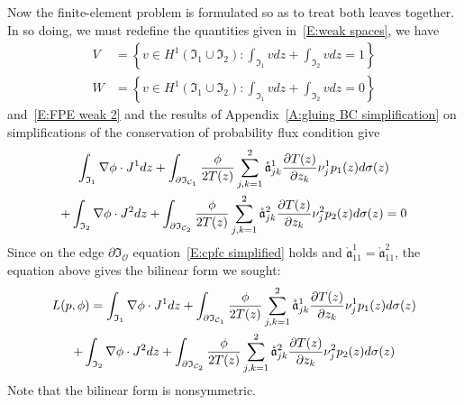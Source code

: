 Now the finite-element problem is formulated so as to treat both leaves together. In so doing, we must redefine the quantities given in~\eqref{E:weak spaces}, we have
\begin{align*}
V &= \left\{v \in H^1(\mathfrak I_1 \cup \mathfrak I_2): \int_\mathfrak{I_1} v dz + \int_\mathfrak{I_2} v dz = 1\right\}\\
W &= \left\{v \in H^1(\mathfrak I_1 \cup \mathfrak I_2): \int_\mathfrak{I_1} v dz + \int_\mathfrak{I_2} v dz = 0\right\}
\end{align*}
and~\eqref{E:FPE weak 2} and the results of Appendix~\ref{A:gluing BC simplification} on simplifications of the conservation of probability flux condition give
\begin{multline*}
\int_{\mathfrak I_1} \nabla \phi \cdot J^1 dz + \int_{\partial \mathfrak I_{\mathcal C_1}} \frac{\phi}{2 T(z)} \sum_{j,k=1}^2 \mathring{\mathfrak{a}}_{jk}^1 \frac{\partial T(z)}{\partial z_k} \nu_j^1 p_1(z) d\sigma(z)\\
+ \int_{\mathfrak I_2} \nabla \phi \cdot J^2 dz + \int_{\partial \mathfrak I_{\mathcal C_2}} \frac{\phi}{2 T(z)} \sum_{j,k=1}^2 \mathring{\mathfrak{a}}_{jk}^2 \frac{\partial T(z)}{\partial z_k} \nu_j^2 p_2(z) d\sigma(z) = 0
\end{multline*}
Since on the edge $\partial \mathfrak I_\mathcal{O}$ equation~\eqref{E:cpfc simplified} holds and $\mathring{\mathfrak{a}}_{11}^1 = \mathring{\mathfrak{a}}_{11}^2$, the equation above gives the bilinear form we sought:
\begin{multline}
\label{E:weak FPE}
L(p,\phi) = \int_{\mathfrak I_1} \nabla \phi \cdot J^1 dz + \int_{\partial \mathfrak I_{\mathcal C_1}} \frac{\phi}{2 T(z)} \sum_{j,k=1}^2 \mathring{\mathfrak{a}}_{jk}^1 \frac{\partial T(z)}{\partial z_k} \nu_j^1 p_1(z) d\sigma(z)\\
+ \int_{\mathfrak I_2} \nabla \phi \cdot J^2 dz + \int_{\partial \mathfrak I_{\mathcal C_2}} \frac{\phi}{2 T(z)} \sum_{j,k=1}^2 \mathring{\mathfrak{a}}_{jk}^2 \frac{\partial T(z)}{\partial z_k} \nu_j^2 p_2(z) d\sigma(z)
\end{multline}
Note that the bilinear form is nonsymmetric.

